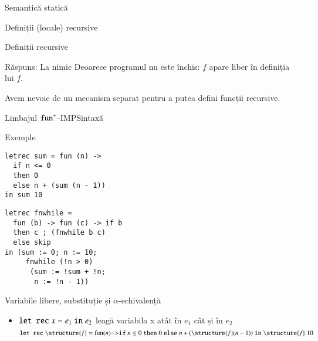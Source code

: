 \begin{section}{Semantică statică}
\begin{subsection}{Definiții (locale) recursive}
\begin{frame}{Definiții recursive }
\begin{alertblock}{Răspuns: La nimic}
Deoarece programul nu este închis: $f$ apare liber în definiția lui $f$. 

Avem nevoie de un mecanism separat  pentru a putea defini funcții recursive.
\end{alertblock}

\end{frame}

\begin{frame}[fragile]{Limbajul $\mathrel{\text{\ttfamily fun}}^+$-IMP}{Sintaxă}
\vspace{-5ex}

\vspace{-3ex}
\begin{block}{Exemple}
\begin{minipage}[t]{.35\columnwidth}
\begin{verbatim}
letrec sum = fun (n) ->
  if n <= 0 
  then 0 
  else n + (sum (n - 1))
in sum 10 
\end{verbatim}
\end{minipage}
\hfill\begin{minipage}[t]{.5\columnwidth}
\begin{verbatim}
letrec fnwhile = 
  fun (b) -> fun (c) -> if b 
  then c ; (fnwhile b c) 
  else skip
in (sum := 0; n := 10;
     fnwhile (!n > 0) 
      (sum := !sum + !n; 
       n := !n - 1)) 
\end{verbatim}
\end{minipage}
\end{block}
\end{frame}

\begin{frame}{Variabile libere, substituție și $\alpha$-echivalență}
\begin{itemize}
\item $\mathrel{\text{\ttfamily let rec}} x = e_1 \mathrel{\text{\ttfamily in}} e_2$ leagă variabila x atât în $e_1$ cât și în $e_2$
\[\Sletrec \structure{f} = \fun{n}{\Sif n \leq 0 \Sthen 0 \Selse n + (\structure{f} (n - 1))} \Sin \structure{f}\; 10\] 


\end{itemize}
\end{frame}
\end{subsection}
\end{section}
